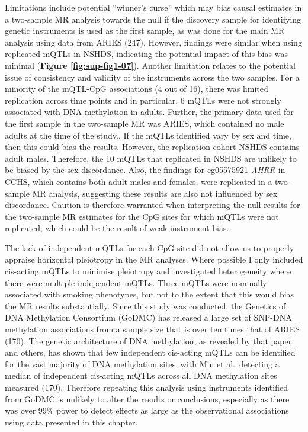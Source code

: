 \documentclass[11pt,twoside]{bristolthesis}
\begin{document}
Limitations include potential ``winner's curse'' which may bias causal estimates in a two-sample MR analysis towards the null if the discovery sample for identifying genetic instruments is used as the first sample, as was done for the main MR analysis using data from ARIES (247). However, findings were similar when using replicated mQTLs in NSHDS, indicating the potential impact of this bias was minimal (\textbf{Figure \ref{fig:sup-fig1-07}}). Another limitation relates to the potential issue of consistency and validity of the instruments across the two samples. For a minority of the mQTL-CpG associations (4 out of 16), there was limited replication across time points and in particular, 6 mQTLs were not strongly associated with DNA methylation in adults. Further, the primary data used for the first sample in the two-sample MR was ARIES, which contained no male adults at the time of the study.. If the mQTLs identified vary by sex and time, then this could bias the results. However, the replication cohort NSHDS contains adult males. Therefore, the 10 mQTLs that replicated in NSHDS are unlikely to be biased by the sex discordance. Also, the findings for cg05575921 \emph{AHRR} in CCHS, which contains both adult males and females, were replicated in a two-sample MR analysis, suggesting these results are also not influenced by sex discordance. Caution is therefore warranted when interpreting the null results for the two-sample MR estimates for the CpG sites for which mQTLs were not replicated, which could be the result of weak-instrument bias.

The lack of independent mQTLs for each CpG site did not allow us to properly appraise horizontal pleiotropy in the MR analyses. Where possible I only included cis-acting mQTLs to minimise pleiotropy and investigated heterogeneity where there were multiple independent mQTLs. Three mQTLs were nominally associated with smoking phenotypes, but not to the extent that this would bias the MR results substantially. Since this study was conducted, the Genetics of DNA Methylation Consortium (GoDMC) has released a large set of SNP-DNA methylation associations from a sample size that is over ten times that of ARIES (170). The genetic architecture of DNA methylation, as revealed by that paper and others, has shown that few independent cis-acting mQTLs can be identified for the vast majority of DNA methylation sites, with Min et al.~detecting a median of independent cis-acting mQTLs across all DNA methylation sites measured (170). Therefore repeating this analysis using instruments identified from GoDMC is unlikely to alter the results or conclusions, especially as there was over 99\% power to detect effects as large as the observational associations using data presented in this chapter.
\end{document}
